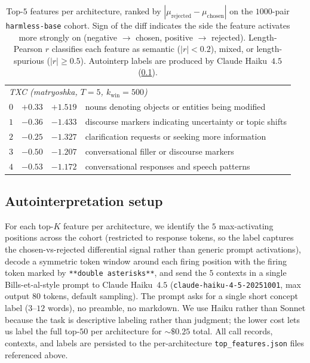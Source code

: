 \begin{table}[t]
\begin{tabular}{l c c l}
        \midrule
        \multicolumn{4}{l}{\emph{TXC (matryoshka, $T=5$, $k_{\mathrm{win}}=500$)}} \\
        $0$ & $+0.33$ & $+1.519$ & nouns denoting objects or entities being modified \\
        $1$ & $-0.36$ & $-1.433$ & discourse markers indicating uncertainty or topic shifts \\
        $2$ & $-0.25$ & $-1.327$ & clarification requests or seeking more information \\
        $3$ & $-0.50$ & $-1.207$ & conversational filler or discourse markers \\
        $4$ & $-0.53$ & $-1.172$ & conversational responses and speech patterns \\
        \bottomrule
    \end{tabular}
    \vspace{3em}
    \caption{Top-$5$ features per architecture, ranked by $|\mu_{\mathrm{rejected}}-\mu_{\mathrm{chosen}}|$ on the $1000$-pair \texttt{harmless-base} cohort. Sign of the diff indicates the side the feature activates more strongly on (negative $\to$ chosen, positive $\to$ rejected). Length-Pearson $r$ classifies each feature as semantic ($|r|<0.2$), mixed, or length-spurious ($|r|\geq 0.5$). Autointerp labels are produced by Claude Haiku~$4.5$ (\cref{app:rlhf-autointerp}). }
    \label{tab:rlhf-top-features}
\end{table}

\subsection{Autointerpretation setup}
\label{app:rlhf-autointerp}

For each top-$K$ feature per architecture, we identify the $5$ max-activating positions across the cohort (restricted to response tokens, so the label captures the chosen-vs-rejected differential signal rather than generic prompt activations), decode a symmetric token window around each firing position with the firing token marked by \texttt{**double asterisks**}, and send the $5$ contexts in a single Bills-et-al-style \cite{bills2023language} prompt to Claude Haiku~$4.5$ (\texttt{claude-haiku-4-5-20251001}, max output $80$ tokens, default sampling). The prompt asks for a single short concept label ($3$--$12$ words), no preamble, no markdown. We use Haiku rather than Sonnet because the task is descriptive labeling rather than judgment; the lower cost lets us label the full top-$50$ per architecture for $\sim\!\$0.25$ total. All call records, contexts, and labels are persisted to the per-architecture \texttt{top\_features.json} files referenced above.

